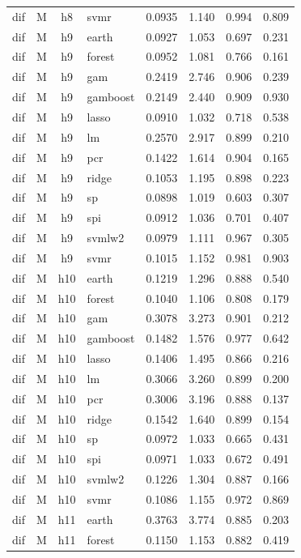 \begin{ThreePartTable}
\begin{longtable}[t]{llclcccc}
dif & M & h8 & svmr & 0.0935 & 1.140 & 0.994 & 0.809\\
\addlinespace
dif & M & h9 & earth & 0.0927 & 1.053 & 0.697 & 0.231\\
dif & M & h9 & forest & 0.0952 & 1.081 & 0.766 & 0.161\\
dif & M & h9 & gam & 0.2419 & 2.746 & 0.906 & 0.239\\
dif & M & h9 & gamboost & 0.2149 & 2.440 & 0.909 & 0.930\\
dif & M & h9 & lasso & 0.0910 & 1.032 & 0.718 & 0.538\\
dif & M & h9 & lm & 0.2570 & 2.917 & 0.899 & 0.210\\
dif & M & h9 & pcr & 0.1422 & 1.614 & 0.904 & 0.165\\
dif & M & h9 & ridge & 0.1053 & 1.195 & 0.898 & 0.223\\
dif & M & h9 & sp & 0.0898 & 1.019 & 0.603 & 0.307\\
dif & M & h9 & spi & 0.0912 & 1.036 & 0.701 & 0.407\\
dif & M & h9 & svmlw2 & 0.0979 & 1.111 & 0.967 & 0.305\\
dif & M & h9 & svmr & 0.1015 & 1.152 & 0.981 & 0.903\\
\addlinespace
dif & M & h10 & earth & 0.1219 & 1.296 & 0.888 & 0.540\\
dif & M & h10 & forest & 0.1040 & 1.106 & 0.808 & 0.179\\
dif & M & h10 & gam & 0.3078 & 3.273 & 0.901 & 0.212\\
dif & M & h10 & gamboost & 0.1482 & 1.576 & 0.977 & 0.642\\
dif & M & h10 & lasso & 0.1406 & 1.495 & 0.866 & 0.216\\
dif & M & h10 & lm & 0.3066 & 3.260 & 0.899 & 0.200\\
dif & M & h10 & pcr & 0.3006 & 3.196 & 0.888 & 0.137\\
dif & M & h10 & ridge & 0.1542 & 1.640 & 0.899 & 0.154\\
dif & M & h10 & sp & 0.0972 & 1.033 & 0.665 & 0.431\\
dif & M & h10 & spi & 0.0971 & 1.033 & 0.672 & 0.491\\
dif & M & h10 & svmlw2 & 0.1226 & 1.304 & 0.887 & 0.166\\
dif & M & h10 & svmr & 0.1086 & 1.155 & 0.972 & 0.869\\
\addlinespace
dif & M & h11 & earth & 0.3763 & 3.774 & 0.885 & 0.203\\
dif & M & h11 & forest & 0.1150 & 1.153 & 0.882 & 0.419\\

\end{longtable}
\end{ThreePartTable}

